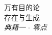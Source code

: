 \documentclass[10pt, openany, oneside]{book}
\renewcommand{\normalsize}{\fontsize{10}{13}\selectfont}
\begin{document}

\thispagestyle{empty}
\vspace*{\fill}
\begin{center}
    {\normalsize\scshape 万有目的论}\\[1.5em]
    {\fontsize{24}{28}\selectfont\scshape 存在与生成}\\[0.8em]
    {\normalsize\itshape 典籍一 $\cdot$ 零点}
\end{center}
\vspace*{\fill}
\newpage

\end{document}

